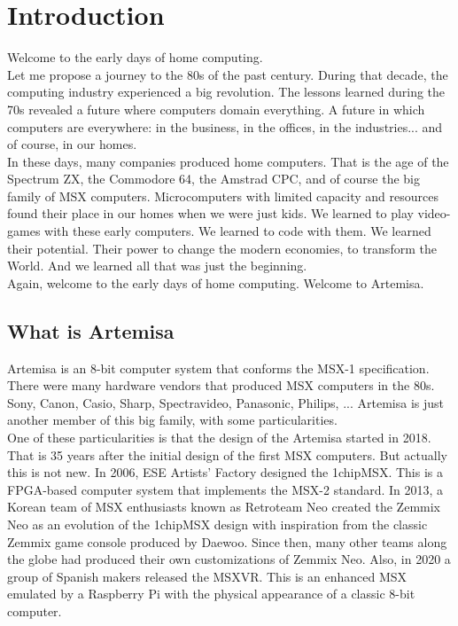 \chapter{Introduction}

Welcome to the early days of home computing.\\

Let me propose a journey to the 80s of the past century. During that decade, the computing industry experienced a big revolution. The lessons learned during the 70s revealed a future where computers domain everything. A future in which computers are everywhere: in the business, in the offices, in the industries... and of course, in our homes.\\

In these days, many companies produced home computers. That is the age of the Spectrum ZX, the Commodore 64, the Amstrad CPC, and of course the big family of MSX computers. Microcomputers with limited capacity and resources  found their place in our homes when we were just kids. We learned to play video-games with these early computers. We learned to code with them. We learned their potential. Their power to change the modern economies, to transform the World. And we learned all that was just the beginning.\\

Again, welcome to the early days of home computing. Welcome to Artemisa.

\section{What is Artemisa}

Artemisa is an 8-bit computer system that conforms the MSX-1 specification. There were many hardware vendors that produced MSX computers in the 80s. Sony, Canon, Casio, Sharp, Spectravideo, Panasonic, Philips, ... Artemisa is just another member of this big family, with some particularities.\\

One of these particularities is that the design of the Artemisa started in 2018. That is 35 years after the initial design of the first MSX computers. But actually this is  not new. In 2006, ESE Artists’ Factory designed the 1chipMSX. This is a FPGA-based computer system that implements the MSX-2 standard. In 2013, a Korean team of MSX enthusiasts known as Retroteam Neo created the Zemmix Neo as an evolution of the 1chipMSX design with inspiration from the classic Zemmix game console produced by Daewoo. Since then, many other teams along the globe had produced their own customizations of Zemmix Neo. Also, in 2020 a group of Spanish makers released the MSXVR. This is an enhanced MSX emulated by a Raspberry Pi with the physical appearance of a classic 8-bit computer. \\

